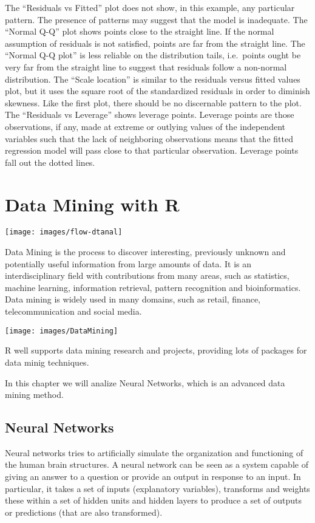 \documentclass[]{book}
\begin{document}
The ``Residuals vs Fitted'' plot does not show, in this example, any
particular pattern. The presence of patterns may suggest that the model
is inadequate. The ``Normal Q-Q'' plot shows points close to the
straight line. If the normal assumption of residuals is not satisfied,
points are far from the straight line. The ``Normal Q-Q plot'' is less
reliable on the distribution tails, i.e.~points ought be very far from
the straight line to suggest that residuals follow a non-normal
distribution. The ``Scale location'' is similar to the residuals versus
fitted values plot, but it uses the square root of the standardized
residuals in order to diminish skewness. Like the first plot, there
should be no discernable pattern to the plot. The ``Residuals vs
Leverage'' shows leverage points. Leverage points are those
observations, if any, made at extreme or outlying values of the
independent variables such that the lack of neighboring observations
means that the fitted regression model will pass close to that
particular observation. Leverage points fall out the dotted lines.

\chapter{Data Mining with R}\label{data-mining-with-r}

\texttt{[image: images/flow-dtanal]}

Data Mining is the process to discover interesting, previously unknown
and potentially useful information from large amounts of data. It is an
interdisciplinary field with contributions from many areas, such as
statistics, machine learning, information retrieval, pattern recognition
and bioinformatics. Data mining is widely used in many domains, such as
retail, finance, telecommunication and social media.

\texttt{[image: images/DataMining]}

R well supports data mining research and projects, providing lots of
packages for data minig techniques.

In this chapter we will analize Neural Networks, which is an advanced
data mining method.

\section{Neural Networks}\label{neural-networks}

Neural networks tries to artificially simulate the organization and
functioning of the human brain structures. A neural network can be seen
as a system capable of giving an answer to a question or provide an
output in response to an input. In particular, it takes a set of inputs
(explanatory variables), transforms and weights these within a set of
hidden units and hidden layers to produce a set of outputs or
predictions (that are also transformed).
\end{document}
